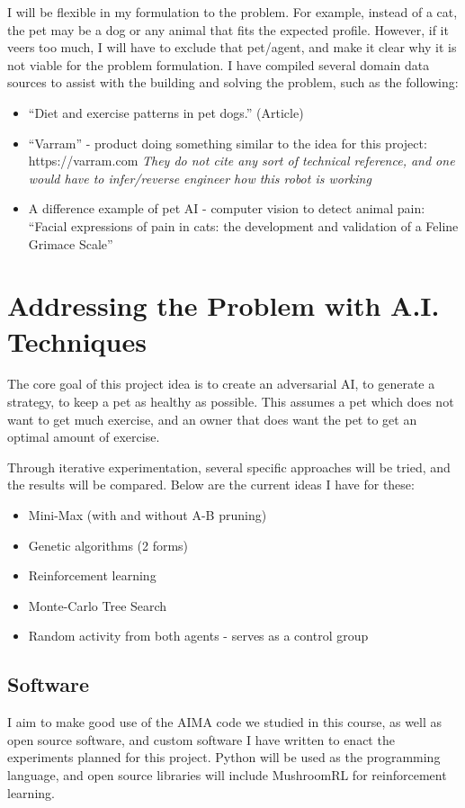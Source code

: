 \documentclass{article}
\begin{document}
I will be flexible in my formulation to the problem. For example, instead of a cat, the pet may be a dog or any animal that fits the expected profile. However, if it veers too much, I will have to exclude that pet/agent, and make it clear why it is not viable for the problem formulation. I have compiled several domain data sources to assist with the building and solving the problem, such as the following:
\begin{itemize}
    \item ``Diet and exercise patterns in pet dogs.'' (Article) \cite{slater1995diet}
    \item ``Varram'' - product doing something similar to the idea for this project: https://varram.com \cite{varram}
    \textit{They do not cite any sort of technical reference, and one would have to infer/reverse engineer how this robot is working}
    \item A difference example of pet AI - computer vision to detect animal pain: ``Facial expressions of pain in cats: the development and validation of a Feline Grimace Scale''  \cite{evangelista2019}
\end{itemize}

\section{Addressing the Problem with A.I. Techniques}

The core goal of this project idea is to create an adversarial AI, to generate a strategy, to keep a pet as healthy as possible. This assumes a pet which does not want to get much exercise, and an owner that does want the pet to get an optimal amount of exercise.

Through iterative experimentation, several specific approaches will be tried, and the results will be compared. Below are the current ideas I have for these:
\begin{itemize}
    \item Mini-Max (with and without A-B pruning)
    \item Genetic algorithms (2 forms)
    \item Reinforcement learning
    \item Monte-Carlo Tree Search
    \item Random activity from both agents - serves as a control group
\end{itemize}

\subsection{Software}
  I aim to make good use of the AIMA code we studied in this course, as well as open source software, and custom software I have written to enact the experiments planned for this project. Python will be used as the programming language, and open source libraries will include MushroomRL for reinforcement learning.\cite{mushroom}
\end{document}
